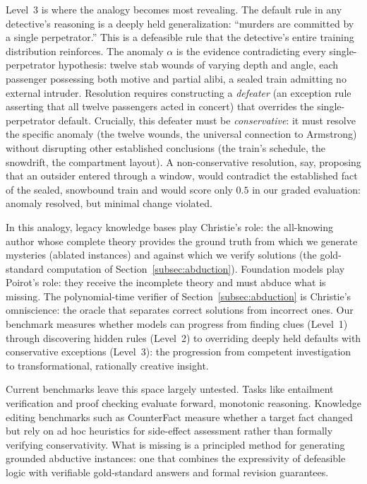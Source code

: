 \documentclass{article}
\theoremstyle{definition}
\begin{document}
Level~3 is where the analogy becomes most revealing. The default rule in any detective's reasoning is a deeply held generalization: ``murders are committed by a single perpetrator.'' This is a defeasible rule that the detective's entire training distribution reinforces. The anomaly $\alpha$ is the evidence contradicting every single-perpetrator hypothesis: twelve stab wounds of varying depth and angle, each passenger possessing both motive and partial alibi, a sealed train admitting no external intruder. Resolution requires constructing a \emph{defeater} (an exception rule asserting that all twelve passengers acted in concert) that overrides the single-perpetrator default. Crucially, this defeater must be \emph{conservative}: it must resolve the specific anomaly (the twelve wounds, the universal connection to Armstrong) without disrupting other established conclusions (the train's schedule, the snowdrift, the compartment layout). A non-conservative resolution, say, proposing that an outsider entered through a window, would contradict the established fact of the sealed, snowbound train and would score only $0.5$ in our graded evaluation: anomaly resolved, but minimal change violated.

In this analogy, legacy knowledge bases play Christie's role: the all-knowing author whose complete theory provides the ground truth from which we generate mysteries (ablated instances) and against which we verify solutions (the gold-standard computation of Section~\ref{subsec:abduction}). Foundation models play Poirot's role: they receive the incomplete theory and must abduce what is missing. The polynomial-time verifier of Section~\ref{subsec:abduction} is Christie's omniscience: the oracle that separates correct solutions from incorrect ones. Our benchmark measures whether models can progress from finding clues (Level~1) through discovering hidden rules (Level~2) to overriding deeply held defaults with conservative exceptions (Level~3): the progression from competent investigation to transformational, rationally creative insight.

Current benchmarks leave this space largely untested. Tasks like entailment verification \cite{tafjord2021proofwriter} and proof checking evaluate forward, monotonic reasoning. Knowledge editing benchmarks such as CounterFact \cite{meng2022locating} measure whether a target fact changed but rely on ad hoc heuristics for side-effect assessment rather than formally verifying conservativity. What is missing is a principled method for generating grounded abductive instances: one that combines the expressivity of defeasible logic with verifiable gold-standard answers and formal revision guarantees.
\end{document}
